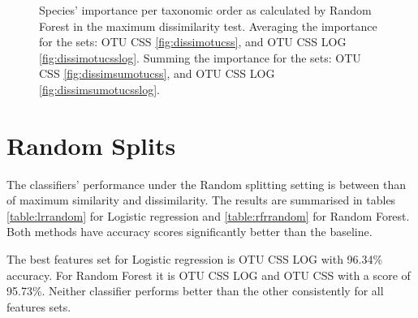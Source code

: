 \begin{figure}[!h]
	\caption{Species' importance per taxonomic order as calculated by Random Forest in the maximum dissimilarity test. Averaging the importance for the sets: OTU CSS \ref{fig:dissimotucss}, and OTU CSS LOG \ref{fig:dissimotucsslog}. Summing the importance for the sets: OTU CSS \ref{fig:dissimsumotucss}, and OTU CSS LOG \ref{fig:dissimsumotucsslog}.
	 }
	\label{fig:dispie}
\end{figure}

\section{Random Splits}
The classifiers' performance under the Random splitting setting is between than of maximum similarity and dissimilarity. The results are summarised in tables \ref{table:lrrandom} for Logistic regression and \ref{table:rfrrandom} for Random Forest. Both methods have accuracy scores significantly better than the baseline.


The best features set for Logistic regression is OTU CSS LOG with 96.34\% accuracy. For Random Forest it is OTU CSS LOG and OTU CSS with a score of 95.73\%. Neither classifier performs better than the other consistently for all features sets. 


